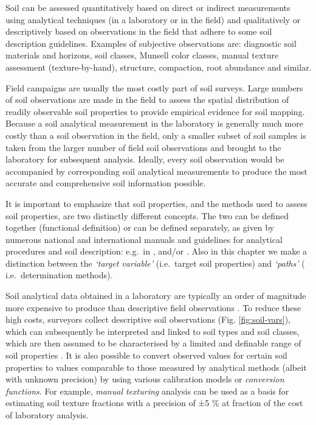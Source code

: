 \documentclass[graybox,natbib,nospthms,UStrade]{svmono}
\let\BeginKnitrBlock\begin \let\EndKnitrBlock\end
\let\BeginKnitrBlock\begin \let\EndKnitrBlock\end
\begin{document}
\BeginKnitrBlock{rmdnote}
Soil can be assessed quantitatively based on direct or indirect
measurements using analytical techniques (in a laboratory or in the
field) and qualitatively or descriptively based on observations in the
field that adhere to some soil description guidelines. Examples of
subjective observations are: diagnostic soil materials and horizons,
soil classes, Munsell color classes, manual texture assessment
(texture-by-hand), structure, compaction, root abundance and similar.
\EndKnitrBlock{rmdnote}

Field campaigns are usually the most costly part of soil surveys. Large numbers
of soil observations are made in the field to assess the spatial
distribution of readily observable soil properties to provide empirical
evidence for soil mapping. Because a soil analytical measurement in the
laboratory is generally much more costly than a soil observation in the field,
only a smaller subset of soil samples is taken from the larger number of
field soil observations and brought to the laboratory for subsequent analysis.
Ideally, every soil observation would be accompanied by corresponding soil analytical
measurements to produce the most accurate and comprehensive soil information possible.

It is important to emphasize that soil properties, and the methods used to assess
soil properties, are two distinctly different concepts. The two can
be defined together (functional definition) or can be defined
separately, as given by numerous national and international manuals and
guidelines for analytical procedures and soil description: e.g.~in
\citeauthor{Burt2004SSIR} \citetext{\citeyear{Burt2004SSIR}; \citealp{carter2007soil}; \citealp{food2006guidelines}}, and/or
\citet{VanReeuwijk2002}. Also in this chapter we make a distinction between the
\emph{`target variable'} (i.e.~target soil properties) and \emph{`paths'} (
i.e.~determination methods).

Soil analytical data obtained in a laboratory are typically an order of
magnitude more expensive to produce than descriptive field observations
\citep{Burrough1971, GehlRice2005, Kempen2011PhDthesis}. To reduce these
high costs, surveyors collect descriptive soil observations (Fig. \ref{fig:soil-vars}),
which can subsequently be interpreted and linked to soil types and soil classes,
which are then assumed to be characterised by a limited and definable range
of soil properties \citep{bouma1998exploring}. It is also possible to convert
observed values for certain soil properties to values comparable to
those measured by analytical methods (albeit with unknown precision) by
using various calibration models or \emph{conversion functions}. For example,
\emph{manual texturing} analysis \citep{FAO1990, SSDS1993} can be used as a basis for estimating
soil texture fractions with a precision of ±5 \% at fraction of
the cost of laboratory analysis.
\end{document}
